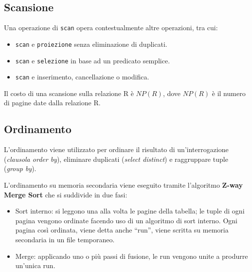\documentclass[oneside,a4paper,11pt]{book}
\theoremstyle{italicstyle}
\theoremstyle{normStyle}
\begin{document}
\subsection{Scansione}
Una operazione di \verb|scan| opera contestualmente altre operazioni, tra cui:
\begin{itemize}
  \item \verb|scan| e \verb|proiezione| senza eliminazione di duplicati.
  \item \verb|scan| e \verb|selezione| in base ad un predicato semplice.
  \item \verb|scan| e inserimento, cancellazione o modifica.
\end{itemize}
Il costo di una scansione sulla relazione R è $NP(R)$, dove $NP(R)$
è il numero di pagine date dalla relazione R.
\subsection{Ordinamento}
L'ordinamento viene utilizzato per ordinare il risultato di un'interrogazione (\textit{clausola 
order by}), eliminare duplicati (\textit{select distinct}) e raggruppare tuple (\textit{group by}).

L'ordinamento su memoria secondaria viene eseguito tramite l'algoritmo \textbf{Z-way Merge Sort} che si suddivide 
in due fasi:
\begin{itemize}
  \item Sort interno: si leggono una alla volta le pagine della tabella; le tuple 
  di ogni pagina vengono ordinate facendo uso di un algoritmo di sort interno. 
  Ogni pagina così ordinata, viene detta anche  ``run'', viene scritta su memoria secondaria in un file temporaneo.
  \item Merge: applicando uno o più passi di fusione, le run vengono unite a produrre un'unica run.
\end{itemize}
\end{document}
